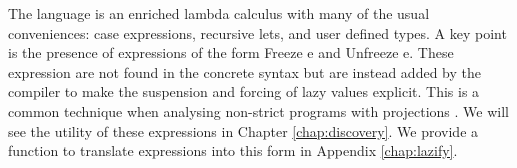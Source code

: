 The language is an enriched lambda calculus with many of the usual
conveniences: case expressions, recursive lets, and user defined types. A key
point is the presence of expressions of the form \<Freeze e\> and \<Unfreeze
e\>.  These expression are not found in the concrete syntax but are instead
added by the compiler to make the suspension and forcing of lazy values
explicit. This is a common technique when analysing non-strict programs with
projections \citep{patersonCompProj, hinze1995projection}. We will see the
utility of these expressions in Chapter \ref{chap:discovery}. We provide a
function to translate expressions into this form in Appendix \ref{chap:lazify}.

